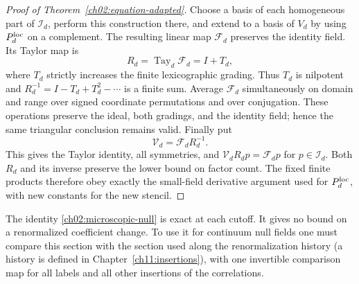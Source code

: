 \begin{proof}[Proof of Theorem~\ref{ch02:equation-adapted}]
Choose a basis of each homogeneous part of $\mathcal I_d$, perform
this construction there, and extend to a basis of $V_d$ by using
$P_d^{\rm loc}$ on a complement. The resulting linear map
$\mathcal F_d$ preserves the identity field. Its Taylor map is
\[
 R_d=\operatorname{Tay}_d\mathcal F_d=I+T_d,
\]
where $T_d$ strictly increases the finite lexicographic grading.
Thus $T_d$ is nilpotent and
$R_d^{-1}=I-T_d+T_d^2-\cdots$ is a finite sum.
Average $\mathcal F_d$ simultaneously on domain and range over
signed coordinate permutations and over conjugation. These
operations preserve the ideal, both gradings, and the identity field;
hence the same triangular conclusion remains valid.
Finally put
\[
 \mathcal V_d=\mathcal F_dR_d^{-1}.
\]
This gives the Taylor identity, all symmetries, and
$\mathcal V_dR_d p=\mathcal F_dp$ for $p\in\mathcal I_d$.
Both $R_d$ and its inverse preserve the lower bound on factor
count. The fixed finite products therefore obey exactly the
small-field derivative argument used for $P_d^{\rm loc}$,
with new constants for the new stencil.
\end{proof}

The identity \eqref{ch02:microscopic-null} is exact at each cutoff.
It gives no bound on a renormalized coefficient change.
To use it for continuum null fields one must compare this section
with the section used along the renormalization history (a history is defined in Chapter~\ref{ch11:insertions}),
with one invertible comparison map for all labels and all other insertions of the correlations.
